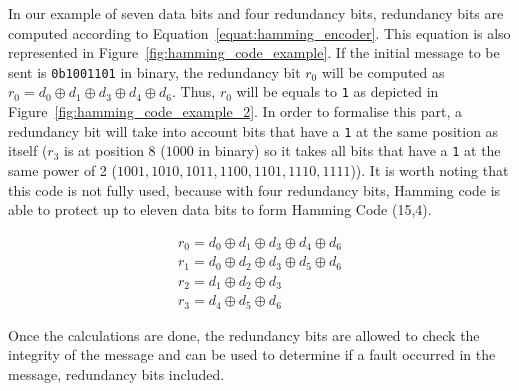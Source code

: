 In our example of seven data bits and four redundancy bits, redundancy bits are computed according to Equation~\ref{equat:hamming_encoder}. This equation is also represented in Figure~\ref{fig:hamming_code_example}. If the initial message to be sent is \texttt{0b1001101} in binary, the redundancy bit $r_0$ will be computed as $r_0 = d_{0} \oplus d_{1} \oplus d_{3} \oplus d_{4} \oplus d_{6}$. Thus, $r_0$ will be equals to \texttt{1} as depicted in Figure~\ref{fig:hamming_code_example_2}. In order to formalise this part, a redundancy bit will take into account bits that have a \texttt{1} at the same position as itself ($r_3$ is at position 8 ($1000$ in binary) so it takes all bits that have a \texttt{1} at the same power of 2 ($1001, 1010, 1011, 1100, 1101, 1110, 1111$)). It is worth noting that this code is not fully used, because with four redundancy bits, Hamming code is able to protect up to eleven data bits to form Hamming Code (15,4).

\begin{equation} \label{equat:hamming_encoder}
    \begin{split}
        r_{0} = d_{0} \oplus d_{1} \oplus d_{3} \oplus d_{4} \oplus d_{6} \\
        r_{1} = d_{0} \oplus d_{2} \oplus d_{3} \oplus d_{5} \oplus d_{6} \\
        r_{2} = d_{1} \oplus d_{2} \oplus d_{3} \\
        r_{3} = d_{4} \oplus d_{5} \oplus d_{6}
    \end{split}
\end{equation}

Once the calculations are done, the redundancy bits are allowed to check the integrity of the message and can be used to determine if a fault occurred in the message, redundancy bits included.

